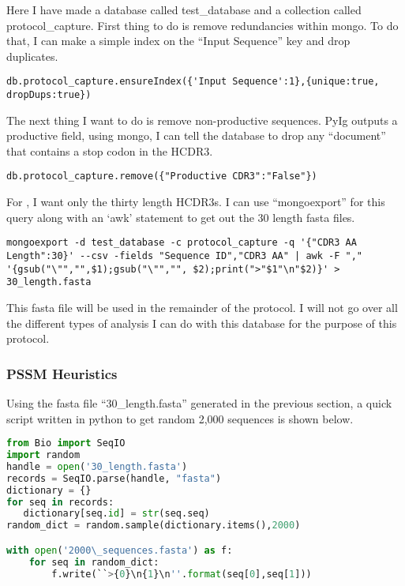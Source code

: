 Here I have made a database called test\_database and a collection called protocol\_capture. First thing to do is remove redundancies within mongo. To do that, I can make a simple index on the ``Input Sequence'' key and drop duplicates.

\begin{lstlisting}[breaklines=true]
db.protocol_capture.ensureIndex({'Input Sequence':1},{unique:true, dropDups:true})
\end{lstlisting}

The next thing I want to do is remove non-productive sequences. PyIg outputs a productive field, using mongo, I can tell the database to drop any ``document'' that contains a stop codon in the HCDR3.

\begin{lstlisting}[breaklines=true]
db.protocol_capture.remove({"Productive CDR3":"False"})
\end{lstlisting}

For \rosetta, I want only the thirty length HCDR3s. I can use ``mongoexport'' for this query along with an `awk' statement to get out the 30 length fasta files.

\begin{lstlisting}[breaklines=true]
mongoexport -d test_database -c protocol_capture -q '{"CDR3 AA Length":30}' --csv -fields "Sequence ID","CDR3 AA" | awk -F "," '{gsub("\"","",$1);gsub("\"","", $2);print(">"$1"\n"$2)}' > 30_length.fasta
\end{lstlisting}

This fasta file will be used in the remainder of the protocol. I will not go over all the different types of analysis I can do with this database for the purpose of this protocol.

\subsubsection{PSSM Heuristics}

Using the fasta file ``30\_length.fasta'' generated in the previous section, a quick script written in python to get random 2,000 sequences is shown below.

\begin{lstlisting}[breaklines=true, language=python]
from Bio import SeqIO
import random
handle = open('30_length.fasta')
records = SeqIO.parse(handle, "fasta")
dictionary = {}
for seq in records:
   dictionary[seq.id] = str(seq.seq)
random_dict = random.sample(dictionary.items(),2000)

with open('2000\_sequences.fasta') as f:
    for seq in random_dict:
        f.write(``>{0}\n{1}\n''.format(seq[0],seq[1]))
\end{lstlisting}

